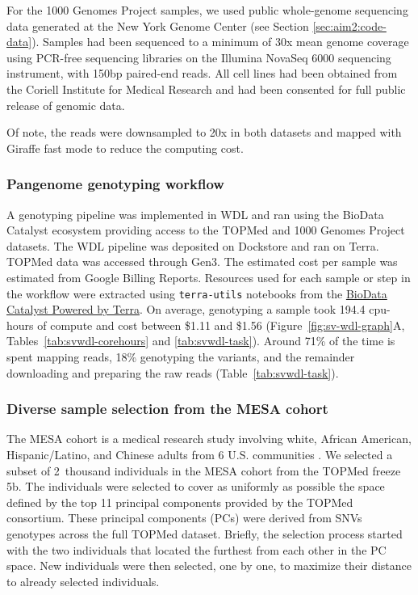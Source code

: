 \documentclass[11pt]{ucscthesis}
\begin{document}
For the 1000 Genomes Project samples, we used public whole-genome sequencing data generated at the New York Genome Center\cite{1000gp_nygc_2021} (see Section \ref{sec:aim2:code-data}).
Samples had been sequenced to a minimum of 30x mean genome coverage using PCR-free sequencing libraries on the Illumina NovaSeq 6000 sequencing instrument, with 150bp paired-end reads.
All cell lines had been obtained from the Coriell Institute for Medical Research and had been consented for full public release of genomic data.

Of note, the reads were downsampled to 20x in both datasets and mapped with Giraffe fast mode to reduce the computing cost.

\subsubsection{Pangenome genotyping workflow}

A genotyping pipeline was implemented in WDL and ran using the BioData Catalyst ecosystem\cite{bdc2020} providing access to the TOPMed and 1000 Genomes Project datasets.
The WDL pipeline was deposited on Dockstore\cite{vgsv_dockstore} and ran on Terra.
TOPMed data was accessed through Gen3.
The estimated cost per sample was estimated from Google Billing Reports.
Resources used for each sample or step in the workflow were extracted using \texttt{terra-utils} notebooks from the \href{https://biodatacatalyst.nhlbi.nih.gov/platforms/terra}{BioData Catalyst Powered by Terra}.
On average, genotyping a sample took 194.4 cpu-hours of compute and cost between \$1.11 and \$1.56 (Figure~\ref{fig:sv-wdl-graph}A, Tables~\ref{tab:svwdl-corehours} and \ref{tab:svwdl-task}).
Around 71\% of the time is spent mapping reads, 18\% genotyping the variants, and the remainder downloading and preparing the raw reads (Table~\ref{tab:svwdl-task}).


\subsubsection{Diverse sample selection from the MESA cohort}
\label{subsec:aim2:mesaselection}

The MESA cohort is a medical research study involving white, African American, Hispanic/Latino, and Chinese adults from 6 U.S. communities \cite{bild2002multi}.
We selected a subset of 2~thousand individuals in the MESA cohort from the TOPMed freeze 5b.
The individuals were selected to cover as uniformly as possible the space defined by the top 11 principal components provided by the TOPMed consortium.
These principal components (PCs) were derived from SNVs genotypes across the full TOPMed dataset.
Briefly, the selection process started with the two individuals that located the furthest from each other in the PC space.
New individuals were then selected, one by one, to maximize their distance to already selected individuals.
\end{document}
